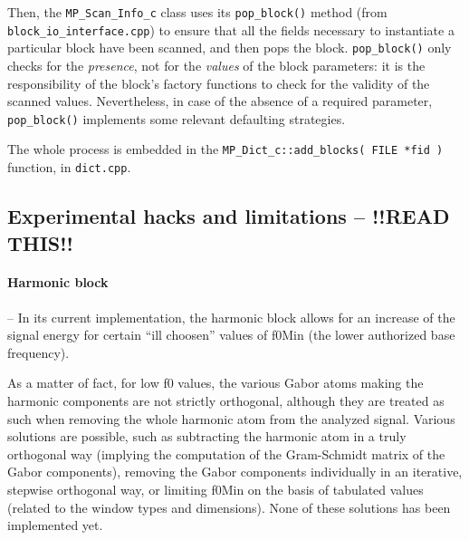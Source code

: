 \documentclass[11pt,a4paper]{article}
\begin{document}
Then, the \verb+MP_Scan_Info_c+ class uses its \verb+pop_block()+ method (from
\verb+block_io_interface.cpp+) to ensure that all the fields necessary to
instantiate a particular block have been scanned, and then pops the block.
\verb+pop_block()+ only checks for the {\em presence}, not for the {\em values}
of the block parameters: it is the responsibility of the block's factory
functions to check for the validity of the scanned values.  Nevertheless, in
case of the absence of a required parameter, \verb+pop_block()+ implements some
relevant defaulting strategies.

The whole process is embedded in the \verb+MP_Dict_c::add_blocks( FILE *fid )+
function, in \verb+dict.cpp+.


\subsection{Experimental hacks and limitations -- !!READ THIS!!}

\paragraph{Harmonic block} -- {\sc In its current implementation, the harmonic block
  allows for an increase of the signal energy for certain ``ill choosen''
  values of f0Min (the lower authorized base frequency).}

As a matter of fact, for low f0 values, the various Gabor atoms making the
harmonic components are not strictly orthogonal, although they are treated as
such when removing the whole harmonic atom from the analyzed signal. Various
solutions are possible, such as subtracting the harmonic atom in a truly
orthogonal way (implying the computation of the Gram-Schmidt matrix of the
Gabor components), removing the Gabor components individually in an iterative,
stepwise orthogonal way, or limiting f0Min on the basis of tabulated values
(related to the window types and dimensions). None of these solutions has been
implemented yet.
\end{document}
